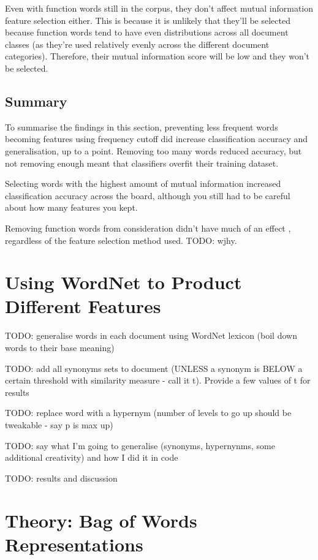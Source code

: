 \documentclass{article}
\begin{document}
Even with function words still in the corpus, they don't affect mutual information feature selection either. This is because it is unlikely that they'll be selected because function words tend to have even distributions across all document classes (as they're used relatively evenly across the different document categories). Therefore, their mutual information score will be low and they won't be selected.

\subsection{Summary}

To summarise the findings in this section, preventing less frequent words becoming features using frequency cutoff did increase classification accuracy and generalisation, up to a point. Removing too many words reduced accuracy, but not removing enough meant that classifiers overfit their training dataset.

Selecting words with the highest amount of mutual information increased classification accuracy across the board, although you still had to be careful about how many features you kept.

Removing function words from consideration didn't have much of an effect , regardless of the feature selection method used. TODO: wjhy.

\section{Using WordNet to Product Different Features}

TODO: generalise words in each document using WordNet lexicon (boil down words to their base meaning)

TODO: add all synonyms sets to document (UNLESS a synonym is BELOW a certain threshold with similarity measure - call it t). Provide a few values of t for results

TODO: replace word with a hypernym (number of levels to go up should be tweakable - say p is max up)

TODO: say what I'm going to generalise (synonyms, hypernynms, some additional creativity) and how I did it in code

TODO: results and discussion

\section{Theory: Bag of Words Representations}
\end{document}
